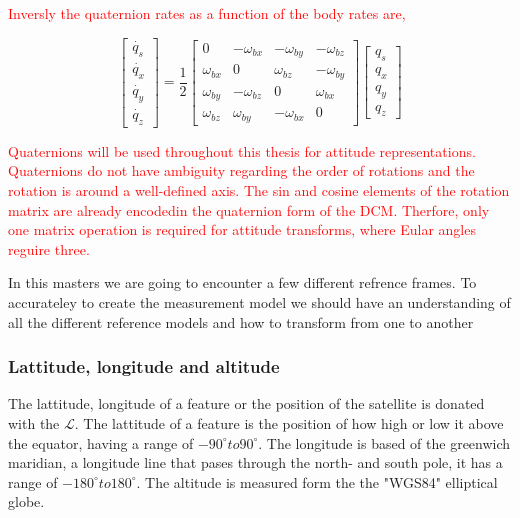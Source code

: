 \textcolor{red}{Inversly the quaternion rates as a function of the body rates are,}

\begin{equation}
    \begin{bmatrix}
        \dot{q_s} \\ \dot{q_x} \\ \dot{q_y} \\ \dot{q_z}
    \end{bmatrix}
    =
    \frac{1}{2}
    \begin{bmatrix}
        0 & -\omega_{bx} & -\omega_{by} & -\omega_{bz}\\
        \omega_{bx} & 0 & \omega_{bz} & -\omega_{by}\\
        \omega_{by} & -\omega_{bz} & 0 & \omega_{bx}\\
        \omega_{bz} & \omega_{by} & -\omega_{bx} & 0 
    \end{bmatrix}
    \begin{bmatrix}
        q_s \\ q_x \\ q_y \\ q_z
    \end{bmatrix}
\end{equation}

\textcolor{red}{Quaternions will be used throughout this thesis for attitude representations. Quaternions do not have ambiguity regarding the order of rotations
and the rotation is around a well-defined axis. The sin and cosine elements of the rotation matrix are already encodedin the quaternion form of the DCM. Therfore,
only one matrix operation is required for attitude transforms, where Eular angles reguire three.}

\label{sec:dynamics}





In this masters we are going to encounter a few different refrence frames. To accurateley to create the measurement model we should have an understanding of all the different 
reference models and how to transform from one to another

\subsubsection{Lattitude, longitude and altitude}

The lattitude, longitude of a feature or the position of the satellite is donated with the $\mathcal{L}$. The lattitude of a feature is the position of how high or low it above the
equator, having a range of $-90^{\circ} to 90^{\circ}$. The longitude is based of the greenwich maridian, a longitude line that pases through the north- and south pole, it has a
range of $-180^{\circ} to 180^{\circ}$. The altitude is measured form the the "WGS84" elliptical globe.

